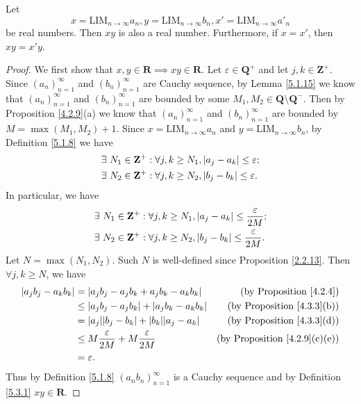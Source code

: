 \begin{proposition}\label{5.3.10}
    Let
    \[
        x = \text{LIM}_{n \to \infty} a_n, y = \text{LIM}_{n \to \infty} b_n, x' = \text{LIM}_{n \to \infty} a'_n
    \]
    be real numbers.
    Then \(xy\) is also a real number.
    Furthermore, if \(x = x'\), then \(xy = x'y\).
\end{proposition}

\begin{proof}
    We first show that \(x, y \in \mathbf{R} \implies xy \in \mathbf{R}\).
    Let \(\varepsilon \in \mathbf{Q}^+\) and let \(j, k \in \mathbf{Z}^+\).
    Since \((a_n)_{n = 1}^\infty\) and \((b_n)_{n = 1}^\infty\) are Cauchy sequence, by Lemma \ref{5.1.15} we know that \((a_n)_{n = 1}^\infty\) and \((b_n)_{n = 1}^\infty\) are bounded by some \(M_1, M_2 \in \mathbf{Q} \setminus \mathbf{Q}^-\).
    Then by Proposition \ref{4.2.9}(a) we know that \((a_n)_{n = 1}^\infty\) and \((b_n)_{n = 1}^\infty\) are bounded by \(M = \max(M_1, M_2) + 1\).
    Since \(x = \text{LIM}_{n \to \infty} a_n\) and \(y = \text{LIM}_{n \to \infty} b_n\), by Definition \ref{5.1.8} we have
    \begin{align*}
         & \exists\ N_1 \in \mathbf{Z}^+ : \forall j, k \geq N_1, \abs*{a_j - a_k} \leq \varepsilon; \\
         & \exists\ N_2 \in \mathbf{Z}^+ : \forall j, k \geq N_2, \abs*{b_j - b_k} \leq \varepsilon.
    \end{align*}
    In particular, we have
    \begin{align*}
         & \exists\ N_1 \in \mathbf{Z}^+ : \forall j, k \geq N_1, \abs*{a_j - a_k} \leq \frac{\varepsilon}{2M}; \\
         & \exists\ N_2 \in \mathbf{Z}^+ : \forall j, k \geq N_2, \abs*{b_j - b_k} \leq \frac{\varepsilon}{2M}.
    \end{align*}
    Let \(N = \max(N_1, N_2)\).
    Such \(N\) is well-defined since Proposition \ref{2.2.13}.
    Then \(\forall j, k \geq N\), we have
    \begin{align*}
        \abs*{a_j b_j - a_k b_k} & = \abs*{a_j b_j - a_j b_k + a_j b_k - a_k b_k}              & \text{(by Proposition \ref{4.2.4})}       \\
                                 & \leq \abs*{a_j b_j - a_j b_k} + \abs*{a_j b_k - a_k b_k}    & \text{(by Proposition \ref{4.3.3}(b))}    \\
                                 & = \abs*{a_j} \abs*{b_j - b_k} + \abs*{b_k} \abs*{a_j - a_k} & \text{(by Proposition \ref{4.3.3}(d))}    \\
                                 & \leq M \frac{\varepsilon}{2M} + M \frac{\varepsilon}{2M}    & \text{(by Proposition \ref{4.2.9}(c)(e))} \\
                                 & = \varepsilon.
    \end{align*}
    Thus by Definition \ref{5.1.8} \((a_n b_n)_{n = 1}^\infty\) is a Cauchy sequence and by Definition \ref{5.3.1} \(xy \in \mathbf{R}\).


\end{proof}
